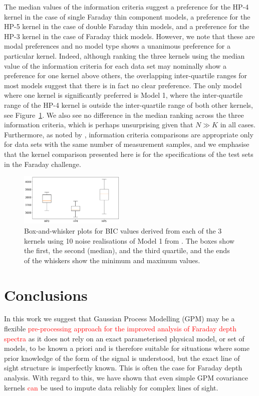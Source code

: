 \documentclass[fleqn,usenatbib]{mnras}
\begin{document}
The median values of the information criteria suggest a preference for the HP-4 kernel in the case of single Faraday thin component models, a preference for the HP-5 kernel in the case of double Faraday thin models, and a preference for the HP-3 kernel in the case of Faraday thick models. However, we note that these are modal preferences and no model type shows a unanimous preference for a particular kernel. Indeed, although ranking the three kernels using the median value of the information criteria for each data set may nominally show a preference for one kernel above others, the overlapping inter-quartile ranges for most models suggest that there is in fact no clear preference. The only model where one kernel is significantly preferred is Model 1, where the inter-quartile range of the HP-4 kernel is outside the inter-quartile range of both other kernels, see Figure~\ref{fig:model1bic}. We also see no difference in the median ranking across the three information criteria, which is perhaps unsurprising given that $N \gg K$ in all cases. Furthermore, as noted by \cite{biccomp}, information criteria comparisons are appropriate only for data sets with the same number of measurement samples, and we emphasise that the kernel comparison presented here is for the specifications of the test sets in the \cite{Sun_2015} Faraday challenge.
%
\begin{figure}
    \centering
    \includegraphics[width=0.45\textwidth]{./FIGURES/model0_info.png}
    \caption{Box-and-whisker plots for BIC values derived from each of the 3 kernels using 10 noise realisations of Model 1 from \protect\cite{Sun_2015}. The boxes show the first, the second (median), and the third quartile, and the ends of the whiskers show the minimum and maximum values.}
    \label{fig:model1bic}
\end{figure}



\section{Conclusions}
\label{sec:conclusions}

In this work we suggest that Gaussian Process Modelling (GPM) may be a flexible \textcolor{red}{pre-processing approach for the improved analysis of Faraday depth spectra} as it does not rely on an exact parameterised physical model, or set of models, to be known a priori and is therefore suitable for situations where some prior knowledge of the form of the signal is understood, but the exact line of sight structure is imperfectly known. This is often the case for Faraday depth analysis. With regard to this, we have shown that even simple GPM covariance kernels \textcolor{red}{can} be used to impute data reliably for complex lines of sight.
\end{document}
